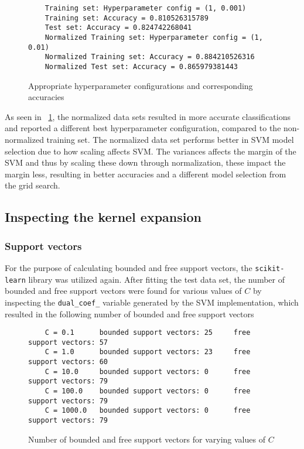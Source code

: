 \documentclass[a4paper]{article}
\begin{document}
\begin{figure}[H]
	\begin{lstlisting}
	Training set: Hyperparameter config = (1, 0.001)
	Training set: Accuracy = 0.810526315789
	Test set: Accuracy = 0.824742268041
	Normalized Training set: Hyperparameter config = (1, 0.01)
	Normalized Training set: Accuracy = 0.884210526316
	Normalized Test set: Accuracy = 0.865979381443
	\end{lstlisting}
	\caption{Appropriate hyperparameter configurations and corresponding accuracies}
	\label{fig:grid_search_results}
\end{figure}

As seen in ~\ref{fig:grid_search_results}, the normalized data sets resulted in more accurate classifications and reported a different best hyperparameter configuration, compared to the non-normalized training set. The normalized data set performs better in SVM model selection due to how scaling affects SVM. The variances affects the margin of the SVM and thus by scaling these down through normalization, these impact the margin less, resulting in better accuracies and a different model selection from the grid search.

\subsection{Inspecting the kernel expansion}
\subsubsection{Support vectors}
For the purpose of calculating bounded and free support vectors, the \texttt{scikit-learn} library was utilized again. After fitting the test data set, the number of bounded and free support vectors were found for various values of $C$ by inspecting the \texttt{dual\_coef\_} variable generated by the SVM implementation, which resulted in the following number of bounded and free support vectors
\begin{figure}[H]
	\begin{lstlisting}
	C = 0.1 	 bounded support vectors: 25 	 free support vectors: 57
	C = 1.0 	 bounded support vectors: 23 	 free support vectors: 60
	C = 10.0 	 bounded support vectors: 0 	 free support vectors: 79
	C = 100.0 	 bounded support vectors: 0 	 free support vectors: 79
	C = 1000.0 	 bounded support vectors: 0 	 free support vectors: 79
	\end{lstlisting}
	\caption{Number of bounded and free support vectors for varying values of $C$}
	\label{fig:free_bounded}
\end{figure}
\end{document}

